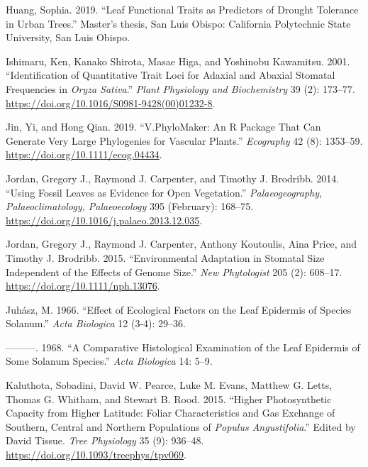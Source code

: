 \documentclass[
  12pt,
]{article}
\newlength{\cslhangindent}
\newlength{\cslentryspacingunit} %
\newenvironment{CSLReferences}[2] %
 {%
  \setlength{\parindent}{0pt}
  \ifodd #1
  \let\oldpar\par
  \def\par{\hangindent=\cslhangindent\oldpar}
  \fi
  \setlength{\parskip}{#2\cslentryspacingunit}
 }%
 {}
\begin{document}
\begin{CSLReferences}{1}{0}
\leavevmode{}%
Huang, Sophia. 2019. {``Leaf Functional Traits as Predictors of Drought Tolerance in Urban Trees.''} Master's thesis, San Luis Obispo: California Polytechnic State University, San Luis Obispo.

\leavevmode{}%
Ishimaru, Ken, Kanako Shirota, Masae Higa, and Yoshinobu Kawamitsu. 2001. {``Identification of Quantitative Trait Loci for Adaxial and Abaxial Stomatal Frequencies in \emph{{Oryza} Sativa}.''} \emph{Plant Physiology and Biochemistry} 39 (2): 173--77. \url{https://doi.org/10.1016/S0981-9428(00)01232-8}.

\leavevmode{}%
Jin, Yi, and Hong Qian. 2019. {``V.{PhyloMaker}: An {R} Package That Can Generate Very Large Phylogenies for Vascular Plants.''} \emph{Ecography} 42 (8): 1353--59. \url{https://doi.org/10.1111/ecog.04434}.

\leavevmode{}%
Jordan, Gregory J., Raymond J. Carpenter, and Timothy J. Brodribb. 2014. {``Using Fossil Leaves as Evidence for Open Vegetation.''} \emph{Palaeogeography, Palaeoclimatology, Palaeoecology} 395 (February): 168--75. \url{https://doi.org/10.1016/j.palaeo.2013.12.035}.

\leavevmode{}%
Jordan, Gregory J., Raymond J. Carpenter, Anthony Koutoulis, Aina Price, and Timothy J. Brodribb. 2015. {``Environmental Adaptation in Stomatal Size Independent of the Effects of Genome Size.''} \emph{New Phytologist} 205 (2): 608--17. \url{https://doi.org/10.1111/nph.13076}.

\leavevmode{}%
Juhász, M. 1966. {``Effect of Ecological Factors on the Leaf Epidermis of Species {Solanum}.''} \emph{Acta Biologica} 12 (3-4): 29--36.

\leavevmode{}%
---------. 1968. {``A Comparative Histological Examination of the Leaf Epidermis of Some {Solanum} Species.''} \emph{Acta Biologica} 14: 5--9.

\leavevmode{}%
Kaluthota, Sobadini, David W. Pearce, Luke M. Evans, Matthew G. Letts, Thomas G. Whitham, and Stewart B. Rood. 2015. {``Higher Photosynthetic Capacity from Higher Latitude: Foliar Characteristics and Gas Exchange of Southern, Central and Northern Populations of \emph{{Populus} Angustifolia}.''} Edited by David Tissue. \emph{Tree Physiology} 35 (9): 936--48. \url{https://doi.org/10.1093/treephys/tpv069}.


\end{CSLReferences}
\end{document}

